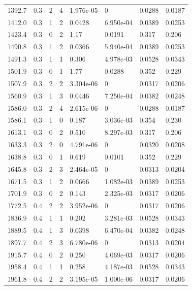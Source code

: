 \documentclass[preview]{standalone}
\begin{document}
{{{\begin{tabular}{L{1.2cm}C{1.2cm} C{0.3cm}C{0.5cm} C{1.4cm}C{1.4cm} C{1.4cm}C{1.4cm}}
  1392.7  &   0.3  & 2     &  4 &  1.976e-05  & 0  & 0.0288 &  0.0187   \\ 
  1412.0  &   0.3  & 1     &  2 &  0.0428  & 6.950e-04  & 0.0389 &  0.0253   \\ 
  1423.4  &   0.3  & 0     &  2 &  1.17  & 0.0191  & 0.317 &  0.206   \\ 
  1490.8  &   0.3  & 1     &  2 &  0.0366  & 5.940e-04  & 0.0389 &  0.0253   \\ 
  1491.3  &   0.3  & 1     &  1 &  0.306  & 4.978e-03  & 0.0528 &  0.0343   \\ 
  1501.9  &   0.3  & 0     &  1 &  1.77  & 0.0288  & 0.352 &  0.229   \\ 
  1507.9  &   0.3  & 2     &  2 &  3.304e-06  & 0  & 0.0317 &  0.0206   \\ 
  1560.9  &   0.3  & 1     &  3 &  0.0446  & 7.250e-04  & 0.0382 &  0.0248   \\ 
  1586.0  &   0.3  & 2     &  4 &  2.615e-06  & 0  & 0.0288 &  0.0187   \\ 
  1586.1  &   0.3  & 1     &  0 &  0.187  & 3.036e-03  & 0.354 &  0.230   \\ 
  1613.1  &   0.3  & 0     &  2 &  0.510  & 8.297e-03  & 0.317 &  0.206   \\ 
  1633.3  &   0.3  & 2     &  0 &  4.791e-06  & 0  & 0.0320 &  0.0208   \\ 
  1638.8  &   0.3  & 0     &  1 &  0.619  & 0.0101  & 0.352 &  0.229   \\ 
  1645.8  &   0.3  & 2     &  3 &  2.464e-05  & 0  & 0.0313 &  0.0204   \\ 
  1671.5  &   0.3  & 1     &  2 &  0.0666  & 1.082e-03  & 0.0389 &  0.0253   \\ 
  1701.9  &   0.3  & 0     &  2 &  0.143  & 2.325e-03  & 0.0317 &  0.0206   \\ 
  1772.5  &   0.4  & 2     &  2 &  3.952e-06  & 0  & 0.0317 &  0.0206   \\ 
  1836.9  &   0.4  & 1     &  1 &  0.202  & 3.281e-03  & 0.0528 &  0.0343   \\ 
  1889.5  &   0.4  & 1     &  3 &  0.0398  & 6.470e-04  & 0.0382 &  0.0248   \\ 
  1897.7  &   0.4  & 2     &  3 &  6.780e-06  & 0  & 0.0313 &  0.0204   \\ 
  1915.7  &   0.4  & 0     &  2 &  0.250  & 4.069e-03  & 0.0317 &  0.0206   \\ 
  1958.4  &   0.4  & 1     &  1 &  0.258  & 4.187e-03  & 0.0528 &  0.0343   \\ 
  1961.8  &   0.4  & 2     &  2 &  3.195e-05  & 1.000e-06  & 0.0317 &  0.0206   \\ 

\end{tabular}}}}
\end{document}
